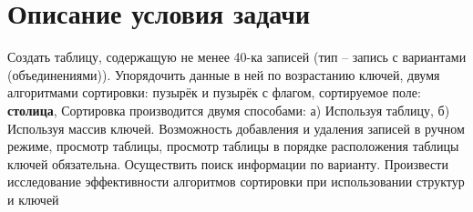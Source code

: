 \section{Описание условия задачи}
Создать таблицу, содержащую не менее 40-ка записей (тип – запись с вариантами
(объединениями)). Упорядочить данные в ней по возрастанию ключей, двумя алгоритмами
сортировки: пузырёк и пузырёк с флагом, сортируемое поле: \textbf{столица}, Сортировка производится двумя способами: а)
Используя таблицу, б) Используя массив ключей.
Возможность добавления и удаления записей в ручном режиме, просмотр таблицы, просмотр
таблицы в порядке расположения таблицы ключей обязательна.
Осуществить поиск информации по варианту.
Произвести исследование эффективности алгоритмов сортировки при использовании структур и ключей
